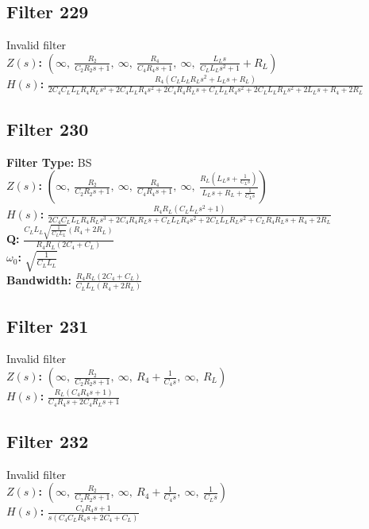 \documentclass{article}
\begin{document}
\subsection*{Filter 229}
Invalid filter \\ 
\textbf{$Z(s)$:} $\left( \infty, \  \frac{R_{2}}{C_{2} R_{2} s + 1}, \  \infty, \  \frac{R_{4}}{C_{4} R_{4} s + 1}, \  \infty, \  \frac{L_{L} s}{C_{L} L_{L} s^{2} + 1} + R_{L}\right)$ \\ 
\textbf{$H(s)$:} $\frac{R_{4} \left(C_{L} L_{L} R_{L} s^{2} + L_{L} s + R_{L}\right)}{2 C_{4} C_{L} L_{L} R_{4} R_{L} s^{3} + 2 C_{4} L_{L} R_{4} s^{2} + 2 C_{4} R_{4} R_{L} s + C_{L} L_{L} R_{4} s^{2} + 2 C_{L} L_{L} R_{L} s^{2} + 2 L_{L} s + R_{4} + 2 R_{L}}$ \\ 
\subsection*{Filter 230}
\textbf{Filter Type:} BS \\ 
\textbf{$Z(s)$:} $\left( \infty, \  \frac{R_{2}}{C_{2} R_{2} s + 1}, \  \infty, \  \frac{R_{4}}{C_{4} R_{4} s + 1}, \  \infty, \  \frac{R_{L} \left(L_{L} s + \frac{1}{C_{L} s}\right)}{L_{L} s + R_{L} + \frac{1}{C_{L} s}}\right)$ \\ 
\textbf{$H(s)$:} $\frac{R_{4} R_{L} \left(C_{L} L_{L} s^{2} + 1\right)}{2 C_{4} C_{L} L_{L} R_{4} R_{L} s^{3} + 2 C_{4} R_{4} R_{L} s + C_{L} L_{L} R_{4} s^{2} + 2 C_{L} L_{L} R_{L} s^{2} + C_{L} R_{4} R_{L} s + R_{4} + 2 R_{L}}$ \\ 
\textbf{Q:} $\frac{C_{L} L_{L} \sqrt{\frac{1}{C_{L} L_{L}}} \left(R_{4} + 2 R_{L}\right)}{R_{4} R_{L} \left(2 C_{4} + C_{L}\right)}$ \\ 
\textbf{$\omega_0$:} $\sqrt{\frac{1}{C_{L} L_{L}}}$ \\ 
\textbf{Bandwidth:} $\frac{R_{4} R_{L} \left(2 C_{4} + C_{L}\right)}{C_{L} L_{L} \left(R_{4} + 2 R_{L}\right)}$ \\ 
\subsection*{Filter 231}
Invalid filter \\ 
\textbf{$Z(s)$:} $\left( \infty, \  \frac{R_{2}}{C_{2} R_{2} s + 1}, \  \infty, \  R_{4} + \frac{1}{C_{4} s}, \  \infty, \  R_{L}\right)$ \\ 
\textbf{$H(s)$:} $\frac{R_{L} \left(C_{4} R_{4} s + 1\right)}{C_{4} R_{4} s + 2 C_{4} R_{L} s + 1}$ \\ 
\subsection*{Filter 232}
Invalid filter \\ 
\textbf{$Z(s)$:} $\left( \infty, \  \frac{R_{2}}{C_{2} R_{2} s + 1}, \  \infty, \  R_{4} + \frac{1}{C_{4} s}, \  \infty, \  \frac{1}{C_{L} s}\right)$ \\ 
\textbf{$H(s)$:} $\frac{C_{4} R_{4} s + 1}{s \left(C_{4} C_{L} R_{4} s + 2 C_{4} + C_{L}\right)}$ \\ 
\end{document}
